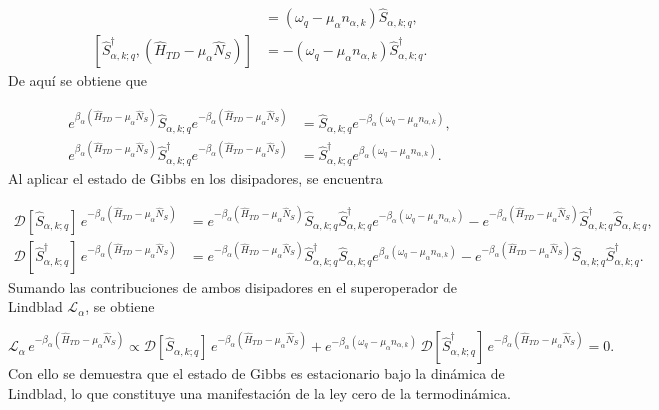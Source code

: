 \begin{appendixs}
\begin{align*}
    [\hat{S}_{\alpha,k;q},(\hat{H}_{TD} - \mu_{\alpha}\hat{N}_{S})] & = (\omega_{q} - \mu_{\alpha}n_{\alpha,k})\hat{S}_{\alpha,k;q},  \\
    [\hat{S}^{\dagger}_{\alpha,k;q},(\hat{H}_{TD} - \mu_{\alpha}\hat{N}_{S})] & = -(\omega_{q} - \mu_{\alpha}n_{\alpha,k})\hat{S}^{\dagger}_{\alpha,k;q}.
\end{align*}
De aquí se obtiene que

\begin{align*}
    e^{\beta_{\alpha}(\hat{H}_{TD} - \mu_{\alpha}\hat{N}_{S})}\hat{S}_{\alpha,k;q} e^{-\beta_{\alpha}(\hat{H}_{TD} - \mu_{\alpha}\hat{N}_{S})} & = \hat{S}_{\alpha,k;q}e^{-\beta_{\alpha}(\omega_{q} - \mu_{\alpha}n_{\alpha,k})}, \\
    e^{\beta_{\alpha}(\hat{H}_{TD} - \mu_{\alpha}\hat{N}_{S})}\hat{S}^{\dagger}_{\alpha,k;q} e^{-\beta_{\alpha}(\hat{H}_{TD} - \mu_{\alpha}\hat{N}_{S})} & = \hat{S}^{\dagger}_{\alpha,k;q}e^{\beta_{\alpha}(\omega_{q} - \mu_{\alpha}n_{\alpha,k})}.
\end{align*}
Al aplicar el estado de Gibbs en los disipadores, se encuentra

\begin{align*}
    \mathcal{D}[\hat{S}_{\alpha,k;q}]\,e^{-\beta_{\alpha}(\hat{H}_{TD} - \mu_{\alpha}\hat{N}_{S})} & =  e^{-\beta_{\alpha}(\hat{H}_{TD} - \mu_{\alpha}\hat{N}_{S})} \hat{S}_{\alpha,k;q}\hat{S}^{\dagger}_{\alpha,k;q} e^{-\beta_{\alpha}(\omega_{q} - \mu_{\alpha}n_{\alpha,k})} - e^{-\beta_{\alpha}(\hat{H}_{TD} - \mu_{\alpha}\hat{N}_{S})} \hat{S}^{\dagger}_{\alpha,k;q}\hat{S}_{\alpha,k;q}, \\
    \mathcal{D}[\hat{S}^{\dagger}_{\alpha,k;q}]\,e^{-\beta_{\alpha}(\hat{H}_{TD} - \mu_{\alpha}\hat{N}_{S})} & = e^{-\beta_{\alpha}(\hat{H}_{TD} - \mu_{\alpha}\hat{N}_{S})} \hat{S}^{\dagger}_{\alpha,k;q}\hat{S}_{\alpha,k;q} e^{\beta_{\alpha}(\omega_{q} - \mu_{\alpha}n_{\alpha,k})} - e^{-\beta_{\alpha}(\hat{H}_{TD} - \mu_{\alpha}\hat{N}_{S})} \hat{S}_{\alpha,k;q}\hat{S}^{\dagger}_{\alpha,k;q}. 
\end{align*}
Sumando las contribuciones de ambos disipadores en el superoperador de Lindblad $\mathcal{L}_{\alpha}$, se obtiene

\begin{equation*}
    \mathcal{L}_{\alpha}\,e^{-\beta_{\alpha}(\hat{H}_{TD} - \mu_{\alpha}\hat{N}_{S})} 
    \propto \mathcal{D}[\hat{S}_{\alpha,k;q}]\,e^{-\beta_{\alpha}(\hat{H}_{TD} - \mu_{\alpha}\hat{N}_{S})} 
    + e^{-\beta_{\alpha}(\omega_{q} - \mu_{\alpha}n_{\alpha,k})}\,\mathcal{D}[\hat{S}^{\dagger}_{\alpha,k;q}]\,e^{-\beta_{\alpha}(\hat{H}_{TD} - \mu_{\alpha}\hat{N}_{S})} = 0.
\end{equation*}
Con ello se demuestra que el estado de Gibbs es estacionario bajo la dinámica de Lindblad, lo que constituye una manifestación de la ley cero de la termodinámica.




\end{appendixs}
